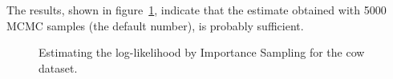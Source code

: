 \par \kern -0.2cm
The results, shown in figure~\ref{fig:cow.LLIS}, indicate that the estimate obtained with 5000 MCMC samples (the default number), is probably sufficient.
\begin{figure}[!h]
\begin{center}
\par \kern -0.5cm
\end{center}
\par \kern -0.5cm
\caption{Estimating the log-likelihood by Importance Sampling for the {\sf cow} dataset.} \label{fig:cow.LLIS}
\end{figure}

\clearpage
\newpage
